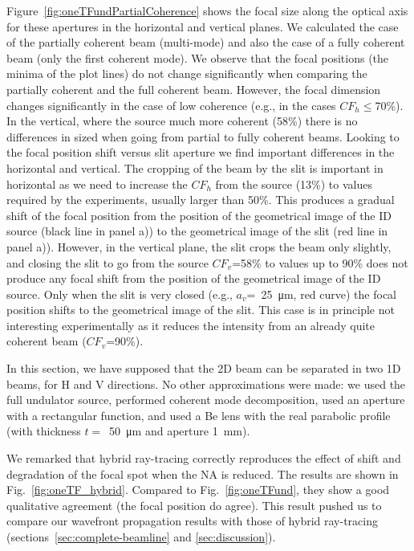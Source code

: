 \documentclass{iucr}              %
\begin{document}
Figure~\ref{fig:oneTFundPartialCoherence} shows the focal size along the optical axis for these apertures in the horizontal and vertical planes. We calculated the case of the partially coherent beam (multi-mode) and also the case of a fully coherent beam (only the first coherent mode). We observe that the focal positions (the minima of the plot lines) do not change significantly when comparing the partially coherent and the full coherent beam. However, the focal dimension changes significantly in the case of low coherence (e.g., in the cases $CF_h\le$70\%). In the vertical, where the source much more coherent (58\%) there is no differences in sized when going from partial to fully coherent beams. Looking to the focal position shift versus slit aperture we find important differences in the horizontal and vertical. The cropping of the beam by the slit is important in horizontal as we need to increase the $CF_h$ from the source (13\%) to values required by the experiments, usually larger than 50\%. This produces a gradual shift of the focal position from the position of the geometrical image of the ID source (black line in panel a)) to the geometrical image of the slit (red line in panel a)). However, in the vertical plane, the slit crops the beam only slightly, and closing the slit to go from the source $CF_v$=58\% to values up to 90\% does not produce any focal shift from the position of the geometrical image of the ID source. Only when the slit is very closed (e.g., $a_v$=~\SI{25}{\micro\meter}, red curve) the focal position shifts to the geometrical image of the slit. This case is in principle not interesting experimentally as it reduces the intensity from an already quite coherent beam ($CF_v$=90\%). 

In this section, we have supposed that the 2D beam can be separated in two 1D beams, for H and V directions. No other approximations were made: we used the full undulator source, performed coherent mode decomposition, used an aperture with a rectangular function, and used a Be lens with the real parabolic profile (with thickness $t=$~\SI{50}{\micro\meter} and aperture \SI{1}{\milli\meter}). 

We remarked that hybrid ray-tracing \cite{codeHYBRID} correctly reproduces the effect of shift and degradation of the focal spot when the NA is reduced. The results are shown in Fig.~\ref{fig:oneTF_hybrid}. Compared to Fig.~\ref{fig:oneTFund}, they show a good qualitative agreement (the focal position do agree). This result pushed us to compare our wavefront propagation results with those of hybrid ray-tracing (sections~\ref{sec:complete-beamline} and \ref{sec:discussion}).
\end{document}
